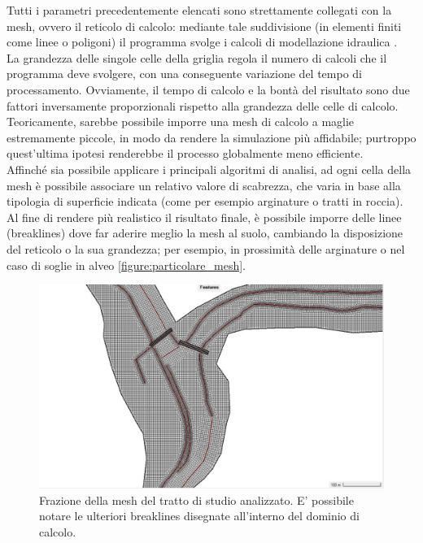 Tutti i parametri precedentemente elencati sono strettamente collegati con la mesh, ovvero il reticolo di calcolo: mediante tale suddivisione (in elementi finiti come linee o poligoni) il programma svolge i calcoli di modellazione idraulica \cite{grid_and_dual_grid}.\\
La grandezza delle singole celle della griglia regola il numero di calcoli che il programma deve svolgere, con una conseguente variazione del tempo di processamento. Ovviamente, il tempo di calcolo e la bontà del risultato sono due fattori inversamente proporzionali rispetto alla grandezza delle celle di calcolo.\\
Teoricamente, sarebbe possibile imporre una mesh di calcolo a maglie estremamente piccole, in modo da rendere la simulazione più affidabile; purtroppo quest'ultima ipotesi renderebbe il processo globalmente meno efficiente.\\
Affinché sia possibile applicare i principali algoritmi di analisi, ad ogni cella della mesh è possibile associare un relativo valore di scabrezza, che varia in base alla tipologia di superficie indicata (come per esempio arginature o tratti in roccia).\\
Al fine di rendere più realistico il risultato finale, è possibile imporre delle linee (breaklines) dove far aderire meglio la mesh al suolo, cambiando la disposizione del reticolo o la sua grandezza; per esempio, in prossimità delle arginature o nel caso di soglie in alveo \eqref{figure:particolare_mesh}.

\begin{figure}[H] \centering
    \includegraphics[scale=0.3]{immagini/particolare_mesh.JPG}
    \caption{Frazione della mesh del tratto di studio analizzato. E' possibile notare le ulteriori breaklines disegnate all'interno del dominio di calcolo.}
    \label{figure:particolare_mesh}
\end{figure}

